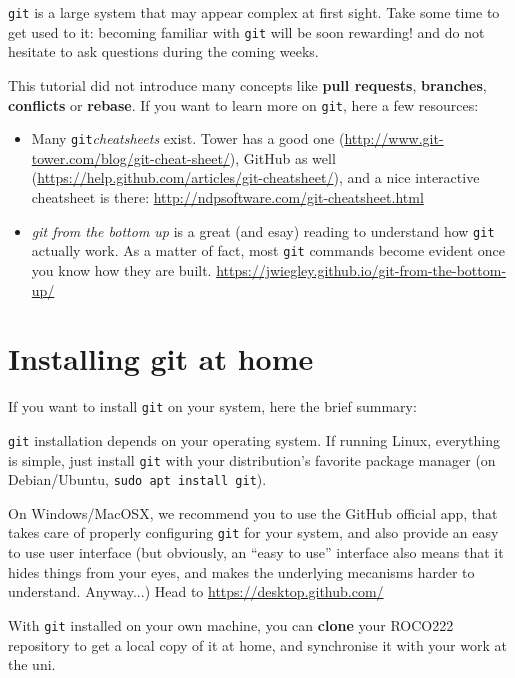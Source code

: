\documentclass{instructions}
\newcommand{\git}{\texttt{git}\xspace}
\begin{document}
\git is a large system that may appear complex at first sight. Take some time to
get used to it: becoming familiar with \git will be soon rewarding! and do not
hesitate to ask questions during the coming weeks.

This tutorial did not introduce many concepts like \textbf{pull requests}, \textbf{branches},
\textbf{conflicts} or \textbf{rebase}. If you want to learn more on \git, here a
few resources:

\begin{itemize}
    \item Many \git \emph{cheatsheets} exist. Tower has a good one
        (\url{http://www.git-tower.com/blog/git-cheat-sheet/}), GitHub as well
        (\url{https://help.github.com/articles/git-cheatsheet/}), and a nice
        interactive cheatsheet is there:
        \url{http://ndpsoftware.com/git-cheatsheet.html}
    \item \emph{git from the bottom up} is a great (and esay) reading to understand how
        \git actually work. As a matter of fact, most \git commands become evident once you know how they are
        built. \url{https://jwiegley.github.io/git-from-the-bottom-up/}
\end{itemize}


\section{Installing git at home}


If you want to install \git on your system, here the brief
summary:

\git installation depends on your operating system. If running Linux,
everything is simple, just install \git with your distribution's
favorite package manager (on Debian/Ubuntu,
\texttt{sudo apt install git}).

On Windows/MacOSX, we recommend you to use the GitHub official app, that takes
care of properly configuring \git for your system, and also provide an
easy to use user interface (but obviously, an ``easy to use'' interface also means
that it hides things from your eyes, and makes the underlying mecanisms harder to
understand. Anyway...) Head to \url{https://desktop.github.com/}


With \git installed on your own machine, you can \textbf{clone} your ROCO222
repository to get a local copy of it at home, and synchronise it with your work
at the uni.
\end{document}
